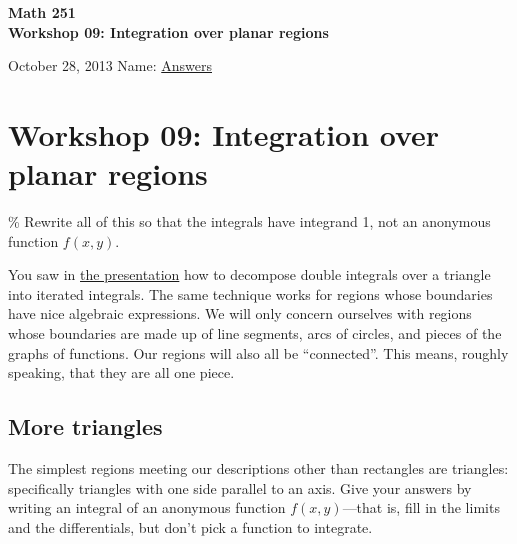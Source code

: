 \documentclass[]{exam}
\begin{document}
\printanswers

\noindent
\textbf{{\large Math 251 \\ Workshop 09: Integration over planar regions}}

\noindent
October 28, 2013  %
\hfill Name: \underline{\hspace{0.5in}Answers\hspace{2in}}

\section{Workshop 09: Integration over planar regions}

\% Rewrite all of this so that the integrals have integrand 1, not an
anonymous function $f(x,y)$.

You saw in \href{../../decks/13/Deck.pdf}{the presentation} how to
decompose double integrals over a triangle into iterated integrals. The
same technique works for regions whose boundaries have nice algebraic
expressions. We will only concern ourselves with regions whose
boundaries are made up of line segments, arcs of circles, and pieces of
the graphs of functions. Our regions will also all be ``connected''.
This means, roughly speaking, that they are all one piece.

\subsection{More triangles}

The simplest regions meeting our descriptions other than rectangles are
triangles: specifically triangles with one side parallel to an axis.
Give your answers by writing an integral of an anonymous function
$f(x,y)$---that is, fill in the limits and the differentials, but don't
pick a function to integrate.
\end{document}
